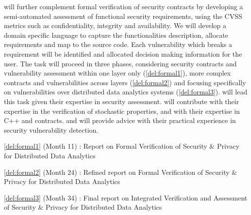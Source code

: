 \begin{Workpackage}{\thewpno}
\begin{Task}
\theTask{} will further complement formal verification of security contracts by developing a semi-automated assessment of functional security requirements, using the CVSS metrics such as confidentiality, integrity and availability. We will develop a domain specific language to capture the functionalities description, allocate requirements and map to the source code. Each vulnerability which breaks a requirement will be identified and allocated decision making information for the user.
The task will proceed in three phases, considering security contracts and vulnerability assessment within one layer only (\ref{del:formal1}), more complex contracts and vulnerabilities across layers (\ref{del:formal2}) and focusing specifically on vulnerabilities over distributed data analytics systems (\ref{del:formal3}).
\YAGshort will lead this task given their expertise in security assessment. \SA will contribute with their expertise in the verification of stochastic properties, and \UCM with their expertise in C++ and contracts. \IBMshort and \SOPRAshort will provide advice with their practical experience in security vulnerability detection.

\end{Task}


\begin{WPDeliverables}
  \begin{compactitem}
  \item \ref{del:formal1} (Month 11) : Report on Formal Verification of Security \& Privacy for Distributed Data Analytics
\item \ref{del:formal2} (Month 24) : 
Refined report on Formal Verification of Security \& Privacy for Distributed Data Analytics 
\item \ref{del:formal3} (Month 34) : Final report on Integrated Verification and Assessment of Security \& Privacy for Distributed Data Analytics 
\end{compactitem}
\end{WPDeliverables}
\end{Workpackage}
